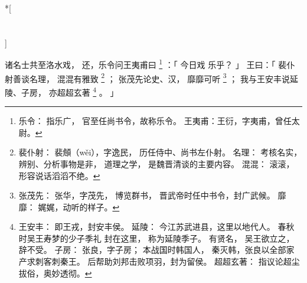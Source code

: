 
\switchcolumn[0]*[\section{}]

诸名士共至洛水戏，
还，乐令问王夷甫曰%
\footnote{%
    乐令：
        指乐广，
        官至任尚书令，故称乐令。
    王夷甫：王衍，字夷甫，曾任太尉。
}%
：「
    今日戏
    乐乎？
」
王曰：「
    裴仆射善谈名理，
    混混有雅致%
    \footnote{%
        裴仆射：
            裴頠（wěi），字逸民，
            历任侍中、尚书左仆射。
        名理：
            考核名实，辨别、分析事物是非，
            道理之学，
            是魏晋清谈的主要内容。
        混混：
            滚滚，形容说话滔滔不绝。
    }%
    ；
    张茂先论史、汉，
    靡靡可听%
    \footnote{%
        张茂先：
            张华，字茂先，
            博览群书，
            晋武帝时任中书令，封广武候。
        靡靡：
            娓娓，动听的样子。
    }%
    ；
    我与王安丰说延陵、子房，
    亦超超玄著%
    \footnote{%
        王安丰：
            即王戎，封安丰侯。
        延陵：
            今江苏武进县，这里以地代人。
            春秋时吴王寿梦的少子季礼
            封在这里，
            称为延陵季子。
            有贤名，
            吴王欲立之，辞不受。
        子房：
            张良，字子房；
            本战国时韩国人，
            秦灭韩，张良以全部家产求刺客刺秦王。
            后帮助刘邦击败项羽，封为留侯。
        超超玄著：
            指议论超尘拔俗，奥妙透彻。
    }%
    。
」

\switchcolumn



